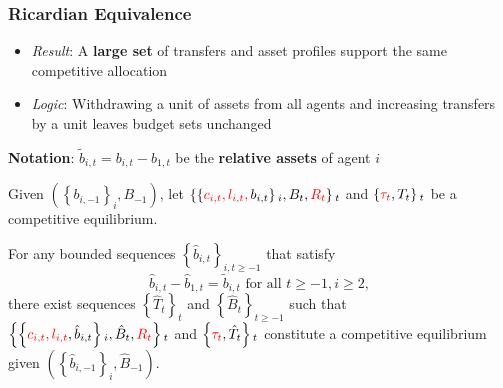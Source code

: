 \documentclass{beamer}
\begin{document}
%
%
%
%



 \begin{frame}
  \frametitle{Ricardian Equivalence}
  \begin{itemize}
   \item \emph{Result}: A \textbf{large set} of transfers and asset profiles support the same competitive allocation
   \item \emph{Logic}: Withdrawing a unit of assets from all agents and increasing transfers by a unit leaves budget sets unchanged
  \end{itemize}
  \textbf{Notation}: $\tilde{b}_{i,t}=b_{i,t}-b_{1,t}$ be the \textbf{relative assets} of agent $i$
  \small
 \begin{theorem}
 Given $\left( \left \{ b_{i,-1}\right \} _{i},B_{-1}\right) $, let $\left \{ \left \{ \color{red}{c}_{i,t},l_{i,t},\color{black}b_{i,t}\right \} _{i},B_{t},\color{red}{R}_{t}\color{black}\right \} _{t} $ and $\left \{ \color{red}\tau _{t}\color{black},T_{t}\right\} _{t}$ be a competitive equilibrium.

 For any bounded sequences $\left \{ \hat{b}_{i,t}\right \} _{i,t\geq -1}$ that satisfy
 \begin{equation*}
 \hat{b}_{i,t}-\hat{b}_{1,t}=\tilde{b}_{i,t}\text{ for all }t\geq -1,i\geq 2,
 \end{equation*}%
 there exist  sequences $\left \{ \hat{T}_{t}\right \} _{t}$ and $%
 \left \{ \hat{B}_{t}\right \} _{t\geq -1}$ such that $\left \{ \left \{ \color{red}{c}_{i,t},l_{i,t}\color{black},\hat{b}%
 _{i,t}\right \} _{i},\hat{B}_{t},\color{red}{R}_{t}\color{black}\right \} _{t}$ and $\left \{
 \color{red}{\tau}_{t}\color{black},\hat{T}_{t}\right \} _{t}$ constitute a competitive
 equilibrium given $\left( \left \{ \hat{b}_{i,-1}\right \} _{i},\hat{B}%
 _{-1}\right) $.
 \end{theorem}
\end{frame}
\end{document}
